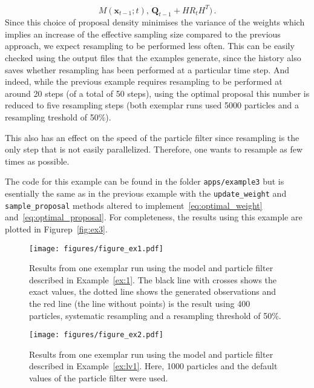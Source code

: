 \begin{example}
\begin{equation}
    M(\bm{x}_{t-1}; t), \, \bm{Q}_{t-1} + H R_t H^T)\,.
  \end{equation}
  Since this choice of proposal density minimises the variance of the
  weights which implies an increase of the effective sampling size
  compared to the previous approach, we expect resampling to be
  performed less often. This can be easily checked using the output
  files that the examples generate, since the history also saves
  whether resampling has been performed at a particular time step. And
  indeed, while the previous example requires resampling to be
  performed at around 20 steps (of a total of 50 steps), using the
  optimal proposal this number is reduced to five resampling steps
  (both exemplar runs used 5000 particles and a resampling treshold of
  50\%).

  This also has an effect on the speed of the particle filter since
  resampling is the only step that is not easily
  parallelized. Therefore, one wants to resample as few times as
  possible.

  The code for this example can be found in the folder
  \texttt{apps/example3} but is esentially the same as in the previous
  example with the \texttt{update\_weight} and
  \texttt{sample\_proposal} methods altered to
  implement~\eqref{eq:optimal_weight} and~\eqref{eq:optimal_proposal}.
  For completeness, the results using this example are plotted
  in Figurep~\ref{fig:ex3}.
\end{example}

\begin{landscape}
  \begin{figure}
    \centering
    \texttt{[image: figures/figure\_ex1.pdf]}
    \caption{Results from one exemplar run using the model and
      particle filter described in Example~\ref{ex:1}. The black line
      with crosses shows the exact values, the dotted line shows the
      generated observations and the red line (the line without
      points) is the result using 400 particles, systematic resampling
      and a resampling threshold of 50\%.}%
    \label{fig:ex1}
  \end{figure}
\end{landscape}

\begin{landscape}
  \begin{figure}
    \centering
    \texttt{[image: figures/figure\_ex2.pdf]}
    \caption{Results from one exemplar run using the model and
      particle filter described in Example~\ref{ex:lv1}. Here, 1000
      particles and the default values of the particle filter were
      used.}%
    \label{fig:ex2}
  \end{figure}
\end{landscape}

